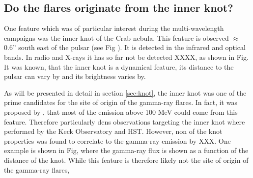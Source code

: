 \subsection{Do the flares originate from the inner knot?}
One feature which was of particular interest during the multi-wavelength campaigns was the inner knot of the Crab nebula. This feature is observed $\approx$0.6'' south east of the pulsar (see Fig ). It is detected in the infrared and optical bands. In radio and X-rays it has so far not be detected XXXX, as shown in Fig. It was known, that the inner knot is a dynamical feature, its distance to the pulsar can vary by and its brightness varies by. 

As will be presented in detail in section \ref{sec:knot}, the inner knot was one of the prime candidates for the site of origin of the gamma-ray flares. In fact, it was proposed by , that most of the emission above 100 MeV could come from this feature. Therefore particularly dens observations targeting the inner knot where performed by the Keck Observatory and HST. However, non of the knot properties was found to correlate to the gamma-ray emission by XXX. One example is shown in Fig, where the gamma-ray flux is shown as a function of the distance of the knot. While this feature is therefore likely not the site of origin of the gamma-ray flares,